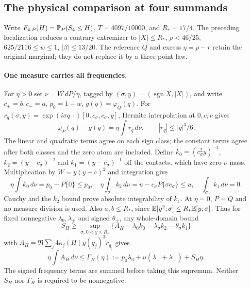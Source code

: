 \subsection{The physical comparison at four summands}\label{j:finite:n4physical}
Write $F_{4,P}(H)=\mathbb P_P(S_4\le H)$, $T=4097/10000$, and
$R_*=17/4$. The preceding localization reduces a contrary extremizer
to $|X|\le R_*$, $\rho<46/25$, $625/2116\le w\le1$,
$|\beta|\le13/20$. The reference $Q$ and excess $\eta=\rho-r$
retain the original marginal; they do not replace it by a three-point law.

\paragraph{One measure carries all frequencies.}
For $\eta>0$ set $\nu=W\,dP/\eta$, tagged by
$(\sigma,y)=(\operatorname{sgn}X,|X|)$, and write $c_+=b,c_-=a$,
$p_0=1-w$, $g(q)=\varphi_Q(q)$. For
$r_q(\sigma,y)=\exp(i\sigma q\,\cdot)[0,c_\sigma,c_\sigma,y]$,
Hermite interpolation at $0,c,c$ gives
\begin{equation}\label{j:finite:n4measure}
 \varphi_P(q)-g(q)=\eta\int r_q\,d\nu,\qquad |r_q|\le |q|^3/6.
\end{equation}
The linear and quadratic terms agree on each sign class; the constant
terms agree after both classes and the zero atom are included.
Define $k_0=(c_\sigma^2y)^{-1}$, $k_2=(y-c_\sigma)^{-2}$ and
$k_1=(y-c_\sigma)^{-1}$ off the contacts, which have zero $\nu$ mass.
Multiplication by $W=y(y-c)^2$ and integration give
\[
 \eta\int k_0\,d\nu=p_0-P\{0\}\le p_0,\quad
 \eta\int_\sigma k_2\,d\nu=u-c_\sigma P\{\sigma c_\sigma\}\le u,\quad
 \int_\sigma k_1\,d\nu=0.
\]
Cauchy and the $k_2$ bound prove absolute integrability of $k_1$.
At $\eta=0$, $P=Q$ and no measure division is used. Also $a,b\le R_*$,
since $\mathbb E[y^2;\sigma]\le R_*\mathbb E[y;\sigma]$.
Thus for fixed nonnegative $\lambda_0,\lambda_\pm$ and signed
$\theta_\pm$, any whole-domain bound
\[
 S_H\ge\sup_{\sigma,\,0<y\le R_*}
 \{A_H-\lambda_0k_0-\lambda_\sigma k_2-\theta_\sigma k_1\}
\]
with $A_H=\Re\sum_j4\kappa_j(H)g(q_j)^3r_{q_j}$ gives
\begin{equation}\label{j:finite:n4priced}
 \eta\int A_H\,d\nu\le
 \Gamma_H(\eta):=p_0\lambda_0+u(\lambda_++\lambda_-)+S_H\eta.
\end{equation}
The signed frequency terms are summed before taking this supremum.
Neither $S_H$ nor $\Gamma_H$ is required to be nonnegative.

